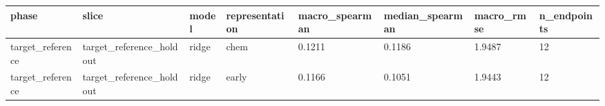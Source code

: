 \begin{tabular}{llllllll}
\hline
phase & slice & model & representation & macro\_spearman & median\_spearman & macro\_rmse & n\_endpoints \\
\hline
target\_reference & target\_reference\_holdout & ridge & chem & 0.1211 & 0.1186 & 1.9487 & 12 \\
target\_reference & target\_reference\_holdout & ridge & early & 0.1166 & 0.1051 & 1.9443 & 12 \\
\hline
\end{tabular}
